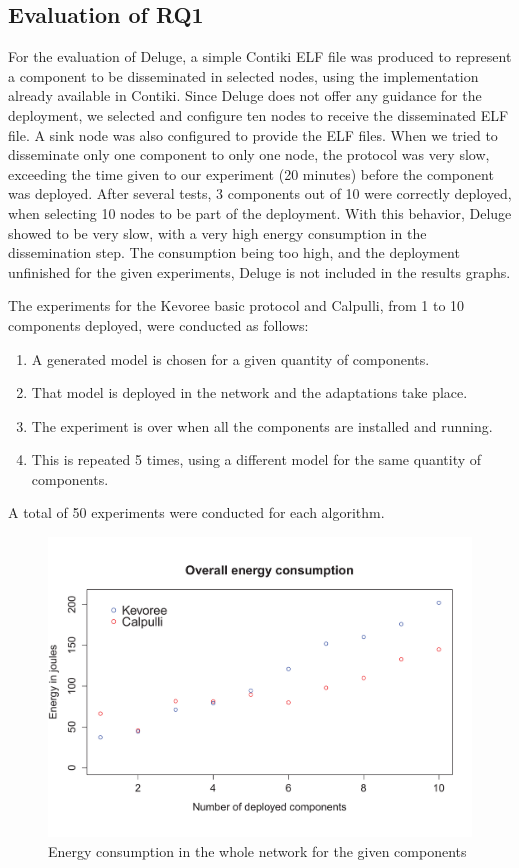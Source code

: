\subsection{Evaluation of RQ1}

For the evaluation of Deluge, a simple Contiki ELF file was produced to represent a component to be disseminated in selected nodes, using the implementation already available in Contiki.
Since Deluge does not offer any guidance for the deployment, we selected and configure ten nodes to receive the disseminated ELF file.
A sink node was also configured to provide the ELF files.
When we tried to disseminate only one component to only one node, the protocol was very slow, exceeding the time given to our experiment (20 minutes) before the component was deployed. After several tests, 3 components out of 10 were correctly deployed, when selecting 10 nodes to be part of the deployment.
With this behavior, Deluge showed to be very slow, with a very high energy consumption in the dissemination step. The consumption being too high, and the deployment unfinished for the given experiments, Deluge is not included in the results graphs.

The experiments for the Kevoree basic protocol and Calpulli, from 1 to 10 components deployed, were conducted as follows:
\begin{enumerate}
	\item A generated model is chosen for a given quantity of components.
	\item That model is deployed in the network and the adaptations take place.
	\item The experiment is over when all the components are installed and running.
	\item This is repeated 5 times, using a different model for the same quantity of components.
\end{enumerate}

A total of 50 experiments were conducted for each algorithm.

\begin{figure}[htb]
	\centering
	\includegraphics[width=0.95\columnwidth]{chapters/calpulli.images/energyWithFonts.pdf}
	\caption{Energy consumption in the whole network for the given components} \label{fig:Energy}
\end{figure}

